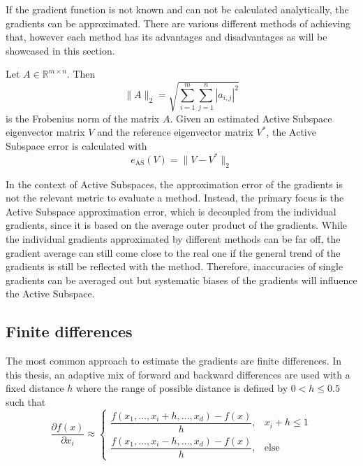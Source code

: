 \documentclass[
  a4paper,  %
  twoside,  %
  bibliography=totoc,
  headsepline,
  cleardoublepage=empty,
  parskip=half,
  draft=false
]{scrbook}
\begin{document}
If the gradient function is not known and can not be calculated analytically, the gradients can be approximated.
There are various different methods of achieving that, however each method has its advantages and disadvantages as will be showcased in this section.

\begin{definition}
Let $A \in \mathds{R}^{m \times n}$. Then
\begin{equation}
\| A\|_2=\sqrt{\sum_{i=1}^m \sum_{j=1}^n |a_{i,j}|^2}
\nonumber
\end{equation}
is the Frobenius norm of the matrix $A$.
Given an estimated Active Subspace eigenvector matrix $V$ and the reference eigenvector matrix $V^*$, the
Active Subspace error is calculated with
\begin{equation}
e_{\text{AS}}(V)=\| V - V^* \|_2
\nonumber
\end{equation}
\end{definition}

In the context of Active Subspaces, the approximation error of the gradients is not the relevant metric to evaluate a method.
Instead, the primary focus is the Active Subspace approximation error, which is decoupled from the individual gradients, since it is based on the average outer product of the gradients.
While the individual gradients approximated by different methods can be far off, the gradient average can still come close to the real one if the general trend of the gradients is still be reflected with the method.
Therefore, inaccuracies of single gradients can be averaged out but systematic biases of the gradients will influence the Active Subspace.


\subsection{Finite differences}

The most common approach to estimate the gradients are finite differences.
In this thesis, an adaptive mix of forward and backward differences are used with a fixed distance $h$ where the range of possible distance is defined by $0 < h \leq 0.5$ such that
\begin{equation}
\frac{\partial f(x)}{\partial x_i} \approx
\begin{cases}
    \dfrac{f(x_1, \dots, x_i + h, \dots, x_d) - f(x)}{h}, & x_i + h \leq 1 \\[1.5em]
    \dfrac{f(x_1, \dots, x_i - h, \dots, x_d) - f(x)}{h}, & \text{else}
\end{cases}
\end{equation}
\end{document}
